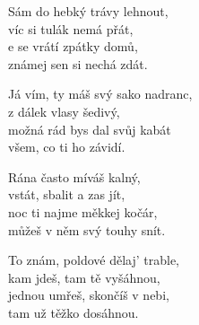 
\cho{}
Sám do hebký trávy lehnout, \\
víc si tulák nemá přát, \\
e se vrátí zpátky domů, \\
známej sen si nechá zdát.

\ve{}
Já vím, ty máš svý sako nadranc,\\
z dálek vlasy šedivý,\\
možná rád bys dal svůj kabát\\
všem, co ti ho závidí.

\cho{}

\ve{}
Rána často míváš kalný,\\
vstát, sbalit a zas jít,\\
noc ti najme měkkej kočár,\\
můžeš v něm svý touhy snít.

\cho{}

\ve{}
To znám, poldové dělaj' trable,\\
kam jdeš, tam tě vyšáhnou,\\
jednou umřeš, skončíš v nebi,\\
tam už těžko dosáhnou.

\cho{}

\esong